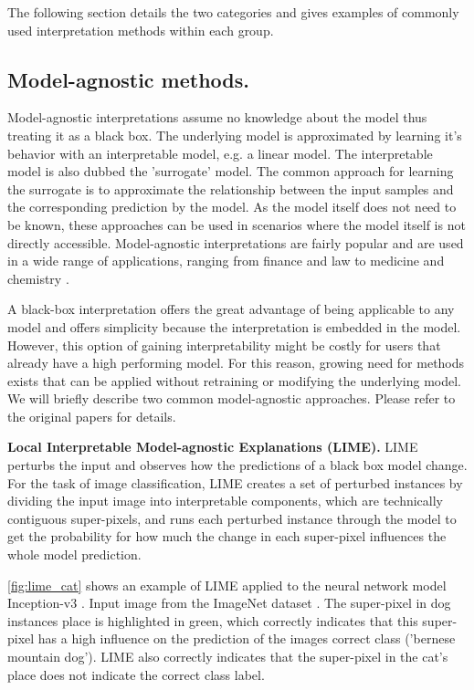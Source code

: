 \documentclass[sigconf]{acmart}
\newcommand{\mypar}[1]{\vspace{0.2cm}\noindent\textbf{#1}}
\begin{document}
The following section details the two categories and gives examples of commonly used interpretation methods within each group. 

\subsection{Model-agnostic methods.}
\label{subsec:bb_methods}

Model-agnostic interpretations assume no knowledge about the model thus treating it as a black box. The underlying model is approximated by learning it's behavior with an interpretable model, e.g. a linear model. The interpretable model is also dubbed the 'surrogate' model. The common approach for learning the surrogate is to approximate the relationship between the input samples and the corresponding prediction by the model.
As the model itself does not need to be known, these approaches can be used in scenarios where the model itself is not directly accessible. Model-agnostic interpretations are fairly popular and are used in a wide range of applications, ranging from finance and law to medicine and chemistry \cite{elshawi2019interpretability, whitmore2016mapping}. 

A black-box interpretation offers the great advantage of being applicable to any model and offers simplicity because the interpretation is embedded in the model. However, this option of gaining interpretability might be costly for users that already have a high performing model. For this reason, growing need for methods exists that can be applied without retraining or modifying the underlying model.
We will briefly describe two common model-agnostic approaches. Please refer to the original papers for details.

\mypar{Local Interpretable Model-agnostic Explanations (LIME).}\newline
LIME \cite{ribeiro2016should} perturbs the input and observes how the predictions of a black box model change. For the task of image classification, LIME creates a set of perturbed instances by dividing the input image into interpretable components, which are technically contiguous super-pixels, and runs each perturbed instance through the model to get the probability for how much the change in each super-pixel influences the whole model prediction. 

\autoref{fig:lime_cat} shows an example of LIME applied to the neural network model Inception-v3 \cite{szegedy2016rethinking}. Input image from the ImageNet dataset \cite{ILSVRC15}. The super-pixel in dog instances place is highlighted in green, which correctly indicates that this super-pixel has a high influence on the prediction of the images correct class ('bernese mountain dog'). LIME also correctly indicates that the super-pixel in the cat's place does not indicate the correct class label.
\end{document}
